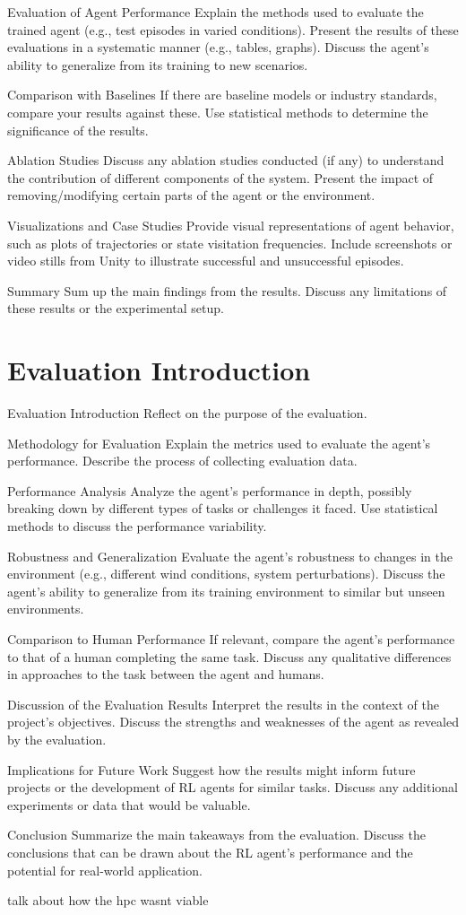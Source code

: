 Evaluation of Agent Performance
Explain the methods used to evaluate the trained agent (e.g., test episodes in varied conditions).
Present the results of these evaluations in a systematic manner (e.g., tables, graphs).
Discuss the agent’s ability to generalize from its training to new scenarios.

Comparison with Baselines
If there are baseline models or industry standards, compare your results against these.
Use statistical methods to determine the significance of the results.

Ablation Studies
Discuss any ablation studies conducted (if any) to understand the contribution of different components of the system.
Present the impact of removing/modifying certain parts of the agent or the environment.

Visualizations and Case Studies
Provide visual representations of agent behavior, such as plots of trajectories or state visitation frequencies.
Include screenshots or video stills from Unity to illustrate successful and unsuccessful episodes.

Summary
Sum up the main findings from the results.
Discuss any limitations of these results or the experimental setup.


\section{Evaluation Introduction}
Evaluation
Introduction
Reflect on the purpose of the evaluation.

Methodology for Evaluation
Explain the metrics used to evaluate the agent’s performance.
Describe the process of collecting evaluation data.

Performance Analysis
Analyze the agent’s performance in depth, possibly breaking down by different types of tasks or challenges it faced.
Use statistical methods to discuss the performance variability.

Robustness and Generalization
Evaluate the agent's robustness to changes in the environment (e.g., different wind conditions, system perturbations).
Discuss the agent's ability to generalize from its training environment to similar but unseen environments.

Comparison to Human Performance
If relevant, compare the agent’s performance to that of a human completing the same task.
Discuss any qualitative differences in approaches to the task between the agent and humans.

Discussion of the Evaluation Results
Interpret the results in the context of the project's objectives.
Discuss the strengths and weaknesses of the agent as revealed by the evaluation.

Implications for Future Work
Suggest how the results might inform future projects or the development of RL agents for similar tasks.
Discuss any additional experiments or data that would be valuable.

Conclusion
Summarize the main takeaways from the evaluation.
Discuss the conclusions that can be drawn about the RL agent's performance and the potential for real-world application.

talk about how the hpc wasnt viable